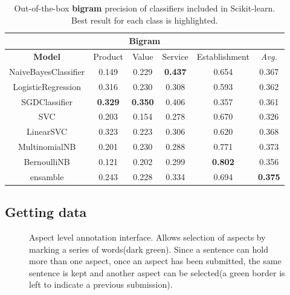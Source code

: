 \documentclass[a4paper,11pt]{kth-mag}
\begin{document}
\begin{table}[h]
  \begin{tabular}{| c | c | c | c | c || c |}
    \hline
    \multicolumn{6}{|c|}{Bigram} \\
    \hline
    \textbf{Model} & Product & Value & Service & Establishment & \emph{Avg.} \\ \hline
    NaiveBayesClassifier& 0.149 & 0.229 & \textbf{0.437} & 0.654 & 0.367 \\
    LogisticRegression  & 0.316 & 0.230 & 0.308 & 0.593 & 0.362 \\
    SGDClassifier       & \textbf{0.329} & \textbf{0.350} & 0.406 & 0.357 & 0.361 \\
    SVC                 & 0.203 & 0.154 & 0.278 & 0.670 & 0.326 \\
    LinearSVC           & 0.323 & 0.223 & 0.306 & 0.620 & 0.368 \\
    MultinomialNB       & 0.201 & 0.230 & 0.288 & 0.771 & 0.373 \\
    BernoulliNB         & 0.121 & 0.202 & 0.299 & \textbf{0.802} & 0.356 \\
    \hline
    ensamble            & 0.243 & 0.228 & 0.334 & 0.694 & \textbf{0.375}\\
    \hline
  \end{tabular}
  \caption{Out-of-the-box \textbf{bigram} precision of classifiers included in Scikit-learn.
    Best result for each class is highlighted.
  }
  \label{tab:individual_bigram_accuracy}
\end{table}




\newpage
\subsection{Getting data}
\label{subsec:getting_data}

\begin{figure}[h]
  \centering
  \caption{Aspect level annotation interface. Allows selection of aspects by marking a series of words(dark green). Since a sentence can hold more than one aspect, once an aspect has been submitted, the same sentence is kept and another aspect can be selected(a green border is left to indicate a previous submission).}
  \label{fig:annotate_aspect}
\end{figure}
\end{document}
